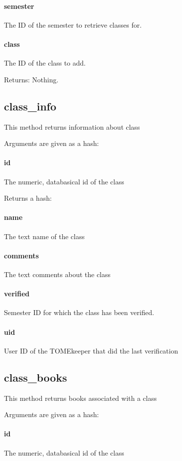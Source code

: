 \documentclass[12pt,titlepage]{article}
\begin{document}
\paragraph{semester}
The ID of the semester to retrieve classes for. 

\paragraph{class}
The ID of the class to add. 

Returns: Nothing.

\subsection{class\_info}
This method returns information about class

Arguments are given as a hash:
\paragraph{id}
The numeric, databasical id of the class 

Returns a hash:
\paragraph{name}
The text name of the class 

\paragraph{comments}
The text comments about the class 

\paragraph{verified}
Semester ID for which the class has been verified. 

\paragraph{uid}
User ID of the TOMEkeeper that did the last verification

\subsection{class\_books}
This method returns books associated with a class

Arguments are given as a hash:
\paragraph{id}
The numeric, databasical id of the class 
\end{document}
